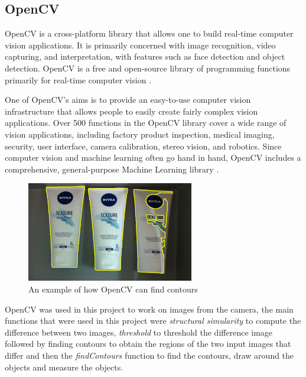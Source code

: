 \subsection{OpenCV}
OpenCV is a cross-platform library that allows one to build real-time computer vision applications. It is primarily concerned with image recognition, video capturing, and interpretation, with features such as face detection and object detection. OpenCV is a free and open-source library of programming functions primarily for real-time computer vision \cite{noauthor_opencv_nodate}.

One of OpenCV's aims is to provide an easy-to-use computer vision infrastructure that allows people to easily create fairly complex vision applications. Over 500 functions in the OpenCV library cover a wide range of vision applications, including factory product inspection, medical imaging, security, user interface, camera calibration, stereo vision, and robotics. Since computer vision and machine learning often go hand in hand, OpenCV includes a comprehensive, general-purpose Machine Learning library \cite{kaehler_what_2016}.

\begin{figure}[h]
    \centering
    \includegraphics[width=0.65\textwidth]{graphics/contour.PNG}
    \caption{An example of how OpenCV can find contours}
    \label{fig:opencvcontour}
\end{figure}

OpenCV was used in this project to work on images from the camera, the main functions that were used in this project were \textit{structural simularity} to compute the difference between two images,  \textit{threshold} to threshold the difference image followed by finding contours to obtain the regions of the two input images that differ and then the \textit{findContours} function to find the contours, draw around the objects and measure the objects.

